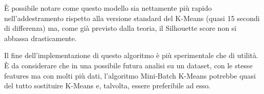 \documentclass[12pt,oneside]{article}
\begin{document}
\begin{enumerate}
    \newpagw
    \begin{justify}
    È possibile notare come questo modello sia nettamente più rapido nell’addestramento rispetto alla versione standard del K-Means (quasi 15 secondi di differenza) ma, come già previsto dalla teoria, il Silhouette score non si abbassa drasticamente.
    \end{justify}
    \begin{justify}
    Il fine dell’implementazione di questo algoritmo è più sperimentale che di utilità. È da considerare che in una possibile futura analisi su un dataset, con le stesse features ma con molti più dati, l’algoritmo Mini-Batch K-Means potrebbe quasi del tutto sostituire K-Means e, talvolta, essere preferibile ad esso.
    \end{justify}
    \end{enumerate}
\end{document}

